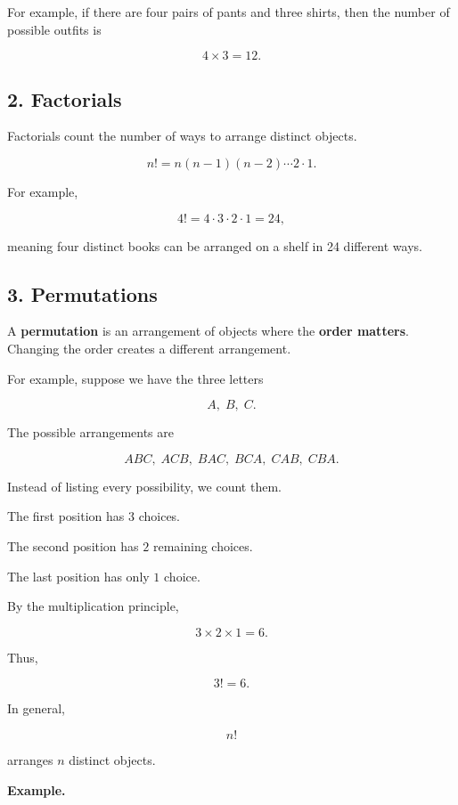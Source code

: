 \documentclass[12pt]{article}
\begin{document}
For example, if there are four pairs of pants and three shirts, then the
number of possible outfits is

\[
4\times3=12.
\]


\subsection*{2. Factorials}

Factorials count the number of ways to arrange distinct objects.

\[
n!=n(n-1)(n-2)\cdots2\cdot1.
\]

For example,

\[
4!=4\cdot3\cdot2\cdot1=24,
\]

meaning four distinct books can be arranged on a shelf in 24 different
ways.


\subsection*{3. Permutations}

A \textbf{permutation} is an arrangement of objects where the
\textbf{order matters}. Changing the order creates a different
arrangement.

For example, suppose we have the three letters

\[
A,\;B,\;C.
\]

The possible arrangements are

\[
ABC,\;
ACB,\;
BAC,\;
BCA,\;
CAB,\;
CBA.
\]

Instead of listing every possibility, we count them.

The first position has $3$ choices.

The second position has $2$ remaining choices.

The last position has only $1$ choice.

By the multiplication principle,

\[
3\times2\times1=6.
\]

Thus,

\[
3!=6.
\]

In general,

\[
n!
\]

arranges $n$ distinct objects.

\bigskip

\textbf{Example.}
\end{document}

